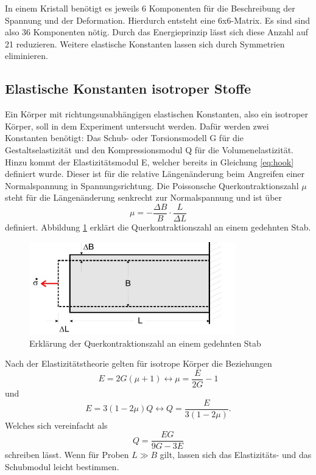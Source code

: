 In einem Kristall benötigt es jeweils 6 Komponenten für die Beschreibung der
Spannung und der Deformation. Hierdurch entsteht eine 6x6-Matrix. Es sind sind
also 36 Komponenten nötig. Durch das Energieprinzip lässt sich diese Anzahl auf
21 reduzieren. Weitere elastische Konstanten lassen sich durch Symmetrien
eliminieren.
\subsection{Elastische Konstanten isotroper Stoffe}
Ein Körper mit richtungsunabhängigen elastischen Konstanten, also ein isotroper
Körper, soll in dem Experiment untersucht werden. Dafür werden zwei Konstanten
benötigt:
Das Schub- oder Torsionsmodell G für die Gestaltselastizität und den
Kompressionsmodul Q für die Volumenelastizität. Hinzu kommt der Elastizitätsmodul
E, welcher bereits in Gleichung \eqref{eq:hook} definiert wurde. Dieser ist für
die relative Längenänderung beim Angreifen einer Normalspannung in
Spannungsrichtung. Die Poissonsche Querkontraktionszahl $\mu$ steht für die
Längenänderung senkrecht zur Normalspannung und ist über
\begin{equation}
  \mu = -\frac{\Delta B}{B}\cdot\frac{L}{\Delta L}
  \label{eq:qkz}
\end{equation}
definiert. Abbildung \ref{qkz} erklärt die Querkontraktionszahl an einem
gedehnten Stab.
\begin{figure}[H]
  \centering
  \includegraphics[width=0.8\textwidth]{bilder/kontraktionszahl.jpg}
  \caption{Erklärung der Querkontraktionszahl an einem gedehnten Stab \cite{102}
  }
  \label{qkz}
\end{figure}
Nach der Elastizitätstheorie gelten für isotrope Körper die Beziehungen
\begin{equation}
  E = 2 G (\mu+1)\leftrightarrow \mu=\frac{E}{2G}-1
\end{equation}
und
\begin{equation}
  E = 3(1-2\mu)Q\leftrightarrow Q=\frac{E}{3(1-2\mu)}.
\end{equation}
Welches sich vereinfacht als
\begin{equation}
  Q=\frac{EG}{9G-3E}
\end{equation}
schreiben lässt. Wenn für Proben $ L \gg B$ gilt, lassen sich das Elastizitäts-
und das Schubmodul leicht bestimmen.
\newpage
